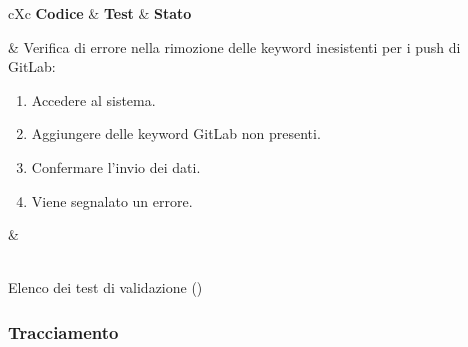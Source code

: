 \begin{table}[H]
	\begin{VTtable}[1.7]{\textwidth}{cXc}
		\rowcolor{\tablegray}
		\textbf{Codice} & \centering\textbf{Test} & \textbf{Stato} \\\toprule
        
        \addtotv & Verifica di errore nella rimozione delle keyword inesistenti per i push di GitLab:
		\begin{enumerate}
			\item Accedere al sistema.
            \item Aggiungere delle keyword GitLab non presenti.
            \item Confermare l'invio dei dati.
            \item Viene segnalato un errore.
		\end{enumerate}
		& \TNI \\
        \bottomrule\\
	\end{VTtable}
	\caption{Elenco dei test di validazione (\thetableCounter)}
\end{table}

\newpage

	\subsubsection{Tracciamento} \label{tracciamentovalidazione}
    
    \setcounter{tv}{0}
	

